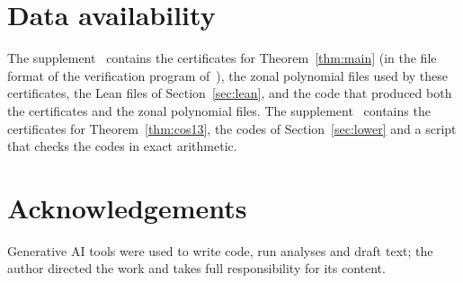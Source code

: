 \documentclass[11pt]{amsart}
\theoremstyle{remark}
\begin{document}
\section*{Data availability}
The supplement~\cite{supp5} contains the certificates for Theorem~\ref{thm:main} (in the file format of the verification program of~\cite{LLMdata}), the zonal polynomial files used by these certificates, the Lean files of Section~\ref{sec:lean}, and the code that produced both the certificates and the zonal polynomial files. The supplement~\cite{supp13} contains the certificates for Theorem~\ref{thm:cos13}, the codes of Section~\ref{sec:lower} and a script that checks the codes in exact arithmetic.

\section*{Acknowledgements}
Generative AI tools were used to write code, run analyses and draft text; the author directed the work and takes full responsibility for its content.
\end{document}
